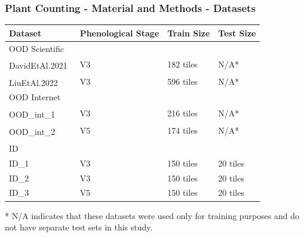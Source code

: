 \documentclass[aspectratio=43]{beamer}
\renewcommand{\thefootnote}{\arabic{footnote}}
\newcommand{\citeDavid}{David et al. Plant detection and counting from high-resolution RGB images acquired from UAVs. \textit{bioRxiv}, 2021}
\newcommand{\citeLiu}{Liu et al. IntegrateNet: A deep learning network for maize stand counting from UAV imagery. \textit{IEEE Geosci. Remote Sens. Lett.}, 19:6512605, 2022}
\newcommand{\citeMaizeSeeding}{Maize\_seeding dataset. \url{https://universe.roboflow.com/objectdetection-hytat/maize\_seeding}}
\newcommand{\citeMaizeSeedling}{Maize-seedling-detection dataset. \url{https://universe.roboflow.com/fyxdds-icloud-com/maize-seedling-detection}}
\newcommand{\citeBumbacaDataset}{Bumbaca, Samuele. ‘The Original Dataset for the Paper "on the Minimum Data Set Requirements for Fine-tuning an Object Detector for Arable Crop Plant Counting: A Case Study on Maize Seedlings"’. Zenodo, 17 April 2025. https://doi.org/10.5281/zenodo.15235602.}
\newcommand{\fcite}[1]{%
  \stepcounter{footnote}%
  \textsuperscript{\thefootnote}%
  \footnotetext[\value{footnote}]{#1}%
}
\begin{document}
\begin{frame}
    \scriptsize
    \frametitle{\small Plant Counting - Material and Methods - Datasets}
    \begin{table}[H]
        \begin{tabularx}{\textwidth}{llXX}
        \toprule
        \textbf{Dataset} & \textbf{Phenological Stage} & \textbf{Train Size} & \textbf{Test Size} \\
        \midrule
        \multicolumn{4}{l}{OOD Scientific} \\
        \hspace{0.5em}DavidEtAl.2021~\fcite{\citeDavid} & V3 & 182 tiles & N/A* \\
        \hspace{0.5em}LiuEtAl.2022~\fcite{\citeLiu} & V3 & 596 tiles & N/A* \\
        \midrule
        \multicolumn{4}{l}{OOD Internet} \\
        \hspace{0.5em}OOD\_int\_1~\fcite{\citeMaizeSeeding} & V3 & 216 tiles & N/A* \\
        \hspace{0.5em}OOD\_int\_2~\fcite{\citeMaizeSeedling} & V5 & 174 tiles & N/A* \\
        \midrule
        \multicolumn{4}{l}{ID~\fcite{\citeBumbacaDataset}} \\
        \hspace{0.5em}ID\_1 & V3 & 150 tiles & 20 tiles \\
        \hspace{0.5em}ID\_2 & V3 & 150 tiles & 20 tiles \\
        \hspace{0.5em}ID\_3 & V5 & 150 tiles & 20 tiles \\
        \bottomrule
        \end{tabularx}
        \noindent\footnotesize{* N/A indicates that these datasets were used only for training purposes and do not have separate test sets in this study.}
    \end{table}
\end{frame}
\end{document}
